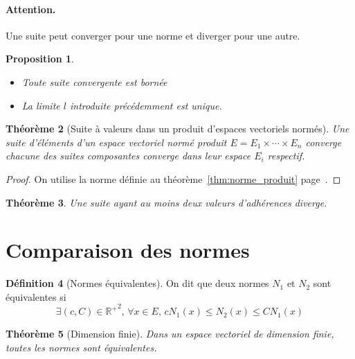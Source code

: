 \documentclass[11pt,a4paper]{report}
\newtheorem{theorem}{Théorème}[chapter]
\newtheorem{itheorem}[theorem]{Théorème}
\newtheorem{prop}[theorem]{Proposition}
\theoremstyle{definition}
\newtheorem{dfn}[theorem]{Définition}
\begin{document}
\paragraph{Attention.} Une suite peut converger pour une norme et diverger pour une autre.
\begin{prop}
     \begin{itemize}
         \item Toute suite convergente est bornée
         \item La limite $l$ introduite précédemment est unique.
     \end{itemize}
\end{prop}
\begin{theorem}[Suite à valeurs dans un produit d'espaces vectoriels normés]
     Une suite d'éléments d'un espace vectoriel normé produit $E = E_1 \times \cdots \times E_n$ converge \Longleftrightarrow chacune des suites composantes converge dans leur espace $E_i$ respectif.
\end{theorem}
\begin{proof}
     On utilise la norme définie au théorème~\ref{thm:norme_produit} page~\pageref{thm:norme_produit}.
\end{proof}
\begin{theorem}
     Une suite ayant au moins deux valeurs d'adhérences diverge.
\end{theorem}

\section{Comparaison des normes} %
\label{sec:comparaison_des_normes}
\begin{dfn}[Normes équivalentes]
     On dit que deux normes $N_1$ et $N_2$ sont équivalentes si
     \begin{equation}
     \exists (c,C)\in {\ensuremath{\mathbb{R}}^{+}}^2,\, \forall x \in E,\, cN_1(x) \le N_2(x) \le CN_1(x)
     \end{equation}     
\end{dfn}
\begin{itheorem}[Dimension finie]
     Dans un espace vectoriel de dimension finie, toutes les normes sont équivalentes.
\end{itheorem}
\end{document}
